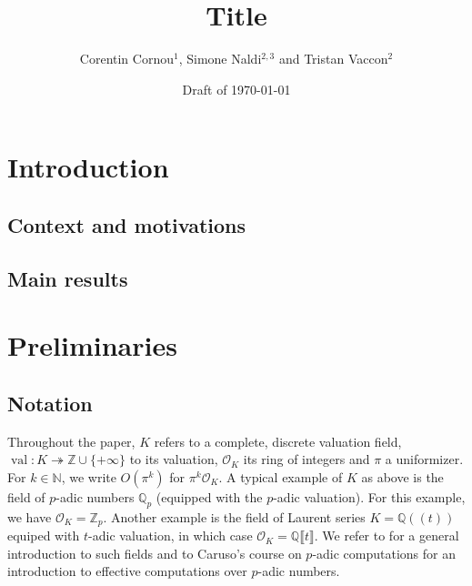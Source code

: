 \documentclass[a4paper,12pt]{article}
\title{\bf Title}
\newcommand{\N}{\mathbb{N}} %
\DeclareMathOperator{\val}{val}
\def\QQ{\ensuremath{\mathbb{Q}}}
\def\ZZ{\ensuremath{\mathbb{Z}}}
\newcommand{\OK}{\mathcal{O}_K}
\begin{document}
\author{Corentin Cornou$^{1}$, Simone Naldi$^{2,3}$ and Tristan Vaccon$^{2}$}


\date{Draft of \today}

\maketitle

\begin{abstract}
\end{abstract}

\tableofcontents

\section{Introduction}

\subsection{Context and motivations}



\subsection{Main results}


\newpage
\section{Preliminaries}

\subsection{Notation}

Throughout the paper, $K$ refers to a complete,
discrete valuation field, $\val : K \twoheadrightarrow \ZZ \cup \{+\infty\}$ to its valuation,
$\OK$ its ring of integers and $\pi$ a uniformizer.
For $k \in \N$, we write $O(\pi^k)$ for $\pi^k \OK$.
A typical example of $K$ as above is the field of $p$-adic numbers 
$\QQ_p$ (equipped with the $p$-adic valuation). For this example, we 
have $\OK = \ZZ_p$.
Another example is the field of Laurent series
$K=\QQ(\!(t)\!)$ equiped with $t$-adic valuation,
in which case $\OK = \QQ \llbracket t \rrbracket$.
We refer to \cite{Serre:1979} for a
general introduction to such fields
and to Caruso's course on $p$-adic computations \cite{caruso_computations_2017}
for an introduction to effective computations over $p$-adic numbers.
\end{document}
